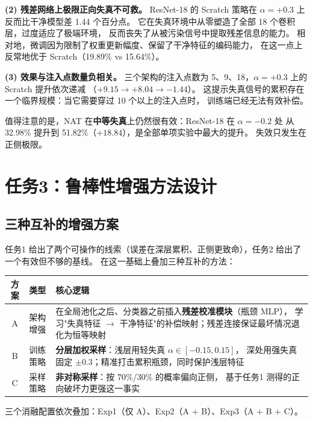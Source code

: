 \documentclass[11pt,a4paper]{ctexart}
\begin{document}
\textbf{(2) 残差网络上极限正向失真不可救。}
ResNet-18 的 Scratch 策略在 $\alpha=+0.3$ 上反而比干净模型差 1.44 个百分点。
它在失真环境中从零塑造了全部 18 个卷积层，过度适应了极端环境，
反而丧失了从被污染信号中提取残差信息的能力。
相对地，微调因为限制了权重更新幅度、保留了干净特征的编码能力，
在这一点上反常地优于 Scratch（19.89\% vs 15.64\%）。

\textbf{(3) 效果与注入点数量负相关。}
三个架构的注入点数为 5、9、18，$\alpha=+0.3$ 上的 Scratch 提升依次递减
（$+9.15 \to +8.04 \to -1.44$）。
这提示失真信号的累积存在一个临界规模：当它需要穿过 10 个以上的注入点时，
训练端已经无法有效补偿。

值得注意的是，NAT 在\textbf{中等失真}上仍然很有效：ResNet-18 在 $\alpha=-0.2$ 处
从 32.98\% 提升到 51.82\%（$+18.84$），是全部单项实验中最大的提升。
失效只发生在正侧极限。

\section{任务3：鲁棒性增强方法设计}
\label{sec:task3}

\subsection{三种互补的增强方案}

任务1 给出了两个可操作的线索（误差在深层累积、正侧更致命），任务2 给出了一个有效但不够的基线。
在这一基础上叠加三种互补的方法：

\begin{center}
\small
\begin{tabular}{clp{7.2cm}}
\toprule
方案 & 类型 & 核心逻辑 \\
\midrule
A & 架构增强 & 在全局池化之后、分类器之前插入\textbf{残差校准模块}（瓶颈 MLP），
              学习"失真特征 $\to$ 干净特征"的补偿映射；残差连接保证最坏情况退化为恒等映射 \\[2pt]
B & 训练策略 & \textbf{分层加权采样}：浅层用轻失真 $\alpha\in[-0.15,0.15]$，
              深处用强失真固定 $\pm0.3$；精准打击累积瓶颈，同时保护浅层特征 \\[2pt]
C & 采样策略 & \textbf{非对称采样}：按 70\%/30\% 的概率偏向正侧，
              基于任务1 测得的正向破坏力更强这一事实 \\
\bottomrule
\end{tabular}
\end{center}

三个消融配置依次叠加：Exp1（仅 A）、Exp2（A $+$ B）、Exp3（A $+$ B $+$ C）。
\end{document}
